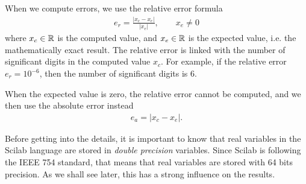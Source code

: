 When we compute errors, we use the relative error formula
\begin{eqnarray}
e_r=\frac{|x_c-x_e|}{|x_e|}, \qquad x_e\neq 0
\end{eqnarray}
where $x_c\in\mathbb{R}$ is the computed value, and $x_e\in\mathbb{R}$ is the 
expected value, i.e. the mathematically exact result.
The relative error is linked with the number of significant 
digits in the computed value $x_c$. For example, if the relative 
error $e_r=10^{-6}$, then the number of significant digits is 6.

When the expected value is zero, the relative error cannot 
be computed, and we then use the absolute error instead 
\begin{eqnarray}
e_a=|x_c-x_e|.
\end{eqnarray}

Before getting into the details, it is important to 
know that real variables in the Scilab language are stored in 
\emph{double precision} variables. Since Scilab is 
following the IEEE 754 standard, that means that real 
variables are stored with 64 bits precision.
As we shall see later, this has a strong influence on the 
results.



